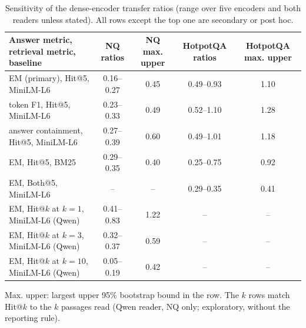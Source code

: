 \begin{table}[t]
\centering
\small
\caption{Sensitivity of the dense-encoder transfer ratios (range over five encoders and both readers unless stated). All rows except the top one are secondary or post hoc.}
\label{tab:sensitivity}
\begin{tabular}{lcccc}
\toprule
Answer metric, retrieval metric, baseline & NQ ratios & NQ max. upper & HotpotQA ratios & HotpotQA max. upper \\
\midrule
EM (primary), Hit@5, MiniLM-L6 & 0.16--0.27 & 0.45 & 0.49--0.93 & 1.10 \\
token F1, Hit@5, MiniLM-L6 & 0.23--0.33 & 0.49 & 0.52--1.10 & 1.28 \\
answer containment, Hit@5, MiniLM-L6 & 0.27--0.39 & 0.60 & 0.49--1.01 & 1.18 \\
EM, Hit@5, BM25 & 0.29--0.35 & 0.40 & 0.25--0.75 & 0.92 \\
EM, Both@5, MiniLM-L6 & -- & -- & 0.29--0.35 & 0.41 \\
EM, Hit@$k$ at $k=1$, MiniLM-L6 (Qwen) & 0.41--0.83 & 1.22 & -- & -- \\
EM, Hit@$k$ at $k=3$, MiniLM-L6 (Qwen) & 0.32--0.37 & 0.59 & -- & -- \\
EM, Hit@$k$ at $k=10$, MiniLM-L6 (Qwen) & 0.05--0.19 & 0.42 & -- & -- \\
\bottomrule
\end{tabular}
\par\smallskip\parbox{\linewidth}{\footnotesize Max. upper: largest upper 95\% bootstrap bound in the row. The $k$ rows match Hit@$k$ to the $k$ passages read (Qwen reader, NQ only; exploratory, without the reporting rule).}
\end{table}
